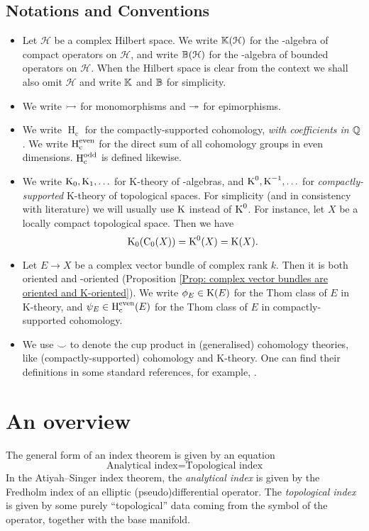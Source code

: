\documentclass[reqno]{scrartcl}
\theoremstyle{definition}
\theoremstyle{remark}
\newcommand{\Hilb}{\mathcal{H}}
\newcommand{\Hc}{\operatorname{H}_{\mathrm{c}}} %
\begin{document}
\subsection*{Notations and Conventions}
\begin{itemize}
\item Let $\Hilb$ be a complex Hilbert space. We write $\Cpt(\Hilb)$ for the \Cst-algebra of compact operators on $\Hilb$, and write $\Bdd(\Hilb)$ for the \Cst-algebra of bounded operators on $\Hilb$. When the Hilbert space is clear from the context we shall also omit $\Hilb$ and write $\mathbb{K}$ and $\mathbb{B}$ for simplicity.
\item We write $\rightarrowtail$ for monomorphisms and $\twoheadrightarrow$ for epimorphisms.
\item We write $\Hc$ for the compactly-supported cohomology, \emph{with coefficients in $\mathbb{Q}$}. We write $\Hc^\even$ for the direct sum of all cohomology groups in even dimensions. $\Hc^\odd$ is defined likewise.
\item We write $\operatorname{K}_0,\operatorname{K}_1,\ldots$ for K-theory of \Cst-algebras, and $\operatorname{K}^0,\operatorname{K}^{-1},\ldots$ for \emph{compactly-supported} K-theory of topological spaces. For simplicity (and in consistency with literature) we will usually use $\operatorname{K}$ instead of $\operatorname{K}^0$. For instance, let $X$ be a locally compact topological space. Then we have
\[ \operatorname{K}_0(\mathrm{C}_0(X))=\operatorname{K}^0(X)=\operatorname{K}(X). \]
\item Let $E\to X$ be a complex vector bundle of complex rank $k$. Then it is both oriented and \K-oriented (Proposition \ref{Prop: complex vector bundles are oriented and K-oriented}). We write $\phi_E\in\operatorname{K}(E)$ for the Thom class of $E$ in K-theory, and $\psi_E\in \Hc^\even(E)$ for the Thom class of $E$ in compactly-supported cohomology. 
\item We use $\smile$ to denote the cup product in (generalised) cohomology theories, like (compactly-supported) cohomology and K-theory. One can find their definitions in some standard references, for example, \cite{hatcherAT,hatcher2003vector}.



\end{itemize}


\newpage
\tableofcontents


\section{An overview}
The general form of an index theorem is given by an equation
\[ \boxed{\text{Analytical index}=\text{Topological index}} \]
In the Atiyah--Singer index theorem, the \emph{analytical index} is given by the Fredholm index of an elliptic (pseudo)differential operator. The \emph{topological index} is given by some purely ``topological'' data coming from the symbol of the operator, together with the base manifold.
\end{document}
